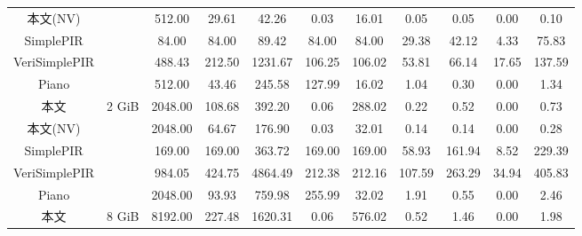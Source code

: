 \begin{table}[]
{\begin{tabular}{@{}cc|ccc|cccccc@{}}
        本文(NV)     &                           & 512.00                       & 29.61                      & 42.26    & 0.03                          & \multicolumn{1}{c|}{16.01}   & 0.05   & 0.05   & 0.00        & 0.10   \\
        SimplePIR     &                           & 84.00                        & 84.00                      & 89.42    & 84.00                         & \multicolumn{1}{c|}{84.00}   & 29.38  & 42.12  & 4.33        & 75.83  \\
        VeriSimplePIR &                           & 488.43                       & 212.50                     & 1231.67  & 106.25                        & \multicolumn{1}{c|}{106.02}  & 53.81  & 66.14  & 17.65       & 137.59 \\
        Piano         &                           & 512.00                       & 43.46                      & 245.58   & 127.99                        & \multicolumn{1}{c|}{16.02}   & 1.04   & 0.30   & 0.00        & 1.34   \\ \midrule
        本文         & \multirow{5}{*}{2 GiB}   & 2048.00                      & 108.68                     & 392.20   & 0.06                          & \multicolumn{1}{c|}{288.02}  & 0.22   & 0.52   & 0.00        & 0.73   \\
        本文(NV)     &                           & 2048.00                      & 64.67                      & 176.90   & 0.03                          & \multicolumn{1}{c|}{32.01}   & 0.14   & 0.14   & 0.00        & 0.28   \\
        SimplePIR     &                           & 169.00                       & 169.00                     & 363.72   & 169.00                        & \multicolumn{1}{c|}{169.00}  & 58.93  & 161.94 & 8.52        & 229.39 \\
        VeriSimplePIR &                           & 984.05                       & 424.75                     & 4864.49  & 212.38                        & \multicolumn{1}{c|}{212.16}  & 107.59 & 263.29 & 34.94       & 405.83 \\
        Piano         &                           & 2048.00                      & 93.93                      & 759.98   & 255.99                        & \multicolumn{1}{c|}{32.02}   & 1.91   & 0.55   & 0.00        & 2.46   \\ \midrule
        本文         & \multirow{5}{*}{8 GiB}   & 8192.00                      & 227.48                     & 1620.31  & 0.06                          & \multicolumn{1}{c|}{576.02}  & 0.52   & 1.46   & 0.00        & 1.98   \\

\end{tabular}}
\end{table}

